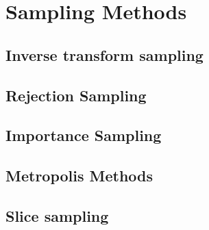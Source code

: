 \chapter{Sampling Methods}
\label{chap:sm}

\section{Inverse transform sampling}
\label{sec:sm:inverse_transform}

\section{Rejection Sampling}
\label{sec:sm:rejection}

\section{Importance Sampling}
\label{sec:sm:importance}

\section{Metropolis Methods}
\label{sec:sm:mh}

\section{Slice sampling}
\label{sec:sm:mh}

